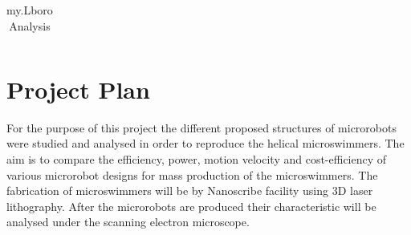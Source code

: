 \documentclass[a4paper,11pt]{article}
\begin{document}
\begin{sloppypar}
\begin{table}[h!]
\begin{tabular}{ c | m{3cm} | m{3cm} | m{3cm} }
  \end{tabular}
  \caption{my.Lboro Analysis}\label{tbl:myLboro}
\end{table}

\section{Project Plan}
For the purpose of this project the different proposed structures of microrobots were studied
 and analysed in order to reproduce the helical microswimmers. The aim is to compare
 the efficiency, power, motion velocity and cost-efficiency of various microrobot designs for mass production
 of the microswimmers. The fabrication of microswimmers will be by Nanoscribe facility using 3D laser
 lithography. After the microrobots are produced their characteristic will be analysed
 under the scanning electron microscope.





\nocite{vogtmann2013modeling}
\nocite{zeeshan2013hybrid}
\nocite{diller2013independent}
%




\end{sloppypar}
\end{document}
